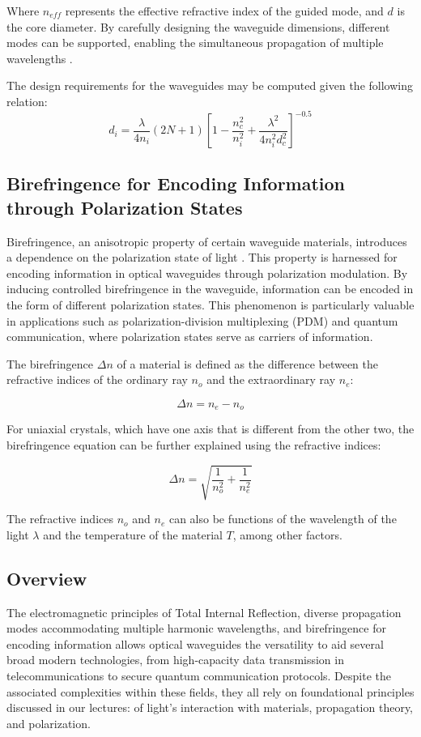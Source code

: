 \documentclass[10pt]{article}
\begin{document}
Where $n_{eff}$ represents the effective refractive index of the guided mode, and
$d$ is the core diameter. By carefully designing the waveguide dimensions, different modes can be supported, enabling the simultaneous propagation of multiple wavelengths \cite{ref03}.

The design requirements for the waveguides may be computed given the following relation:
\begin{equation}
    d_i = \frac{\lambda}{4n_i}(2N + 1)\left[1 - \frac{n_c^2}{n_i^2} + \frac{\lambda^2}{4n_i^2d_c^2}\right]^{-0.5}
\end{equation}

\subsection{Birefringence for Encoding Information through Polarization States}

Birefringence, an anisotropic property of certain waveguide materials, introduces a dependence on the polarization state of light \cite{ref01}. This property is harnessed for encoding information in optical waveguides through polarization modulation.
By inducing controlled birefringence in the waveguide, information can be encoded in the form of different polarization states. This phenomenon is particularly valuable in applications such as polarization-division multiplexing (PDM) and quantum communication, where polarization states serve as carriers of information.

The birefringence \(\Delta n\) of a material is defined as the difference between the refractive indices of the ordinary ray \(n_o\) and the extraordinary ray \(n_e\):

\[
    \Delta n = n_e - n_o
    \]
    
    For uniaxial crystals, which have one axis that is different from the other two, the birefringence equation can be further explained using the refractive indices:
    
    \[
        \Delta n = \sqrt{\frac{1}{n_o^2} + \frac{1}{n_e^2}}
        \]
        
        The refractive indices \(n_o\) and \(n_e\) can also be functions of the wavelength of the light \(\lambda\) and the temperature of the material \(T\), among other factors.
        
        
        \subsection{Overview}
        The electromagnetic principles of Total Internal Reflection, diverse propagation modes accommodating multiple harmonic wavelengths, 
        and birefringence for encoding information allows optical waveguides the versatility to aid several broad modern technologies, 
        from high-capacity data transmission in telecommunications to secure quantum communication protocols. Despite the associated complexities within these fields, 
        they all rely on foundational principles discussed in our lectures: of light's interaction with materials, propagation theory, and polarization.
        
\end{document}

